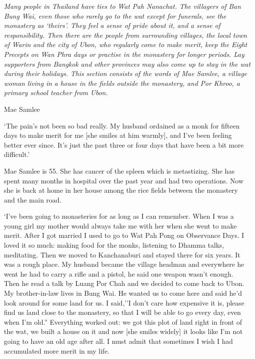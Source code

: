 
\emph{Many people in Thailand have ties to Wat Pah Nanachat. The
villagers of Ban Bung Wai, even those who rarely go to the wat except
for funerals, see the monastery as `theirs'. They feel a sense of pride
about it, and a sense of responsibility. Then there are the people from
surrounding villages, the local town of Warin and the city of Ubon, who
regularly come to make merit, keep the Eight Precepts on Wan Phra days
or practise in the monastery for longer periods. Lay supporters from
Bangkok and other provinces may also come up to stay in the wat during
their holidays. This section consists of the words of Mae Samlee, a
village woman living in a house in the fields outside the monastery, and
Por Khroo, a primary school teacher from Ubon.}

Mae Samlee

`The pain's not been so bad really. My husband ordained as a monk for
fifteen days to make merit for me {[}she smiles at him warmly{]}, and
I've been feeling better ever since. It's just the past three or four
days that have been a bit more difficult.'

Mae Samlee is 55. She has cancer of the spleen which is metastizing. She
has spent many months in hospital over the past year and had two
operations. Now she is back at home in her house among the rice fields
between the monastery and the main road. 

`I've been going to monasteries for as long as I can remember. When I
was a young girl my mother would always take me with her when she went
to make merit. After I got married I used to go to Wat Pah Pong on
Observance Days. I loved it so much: making food for the monks, 
listening to Dhamma talks, meditating. Then we moved to Kanchanaburi and
stayed there for six years. It was a rough place. My husband became the
village headman and everywhere he went he had to carry a rifle and a
pistol, he said one weapon wasn't enough. Then he read a talk by Luang
Por Chah and we decided to come back to Ubon. My brother-in-law lives in
Bung Wai. He wanted us to come here and said he'd look around for some
land for us. I said,''I don't care how expensive it is, please find us
land close to the monastery, so that I will be able to go every day, 
even when I'm old.'' Everything worked out: we got this plot of land
right in front of the wat, we built a house on it and now {[}she smiles
widely{]} it looks like I'm not going to have an old age after all. I
must admit that sometimes I wish I had accumulated more merit in my
life. 

